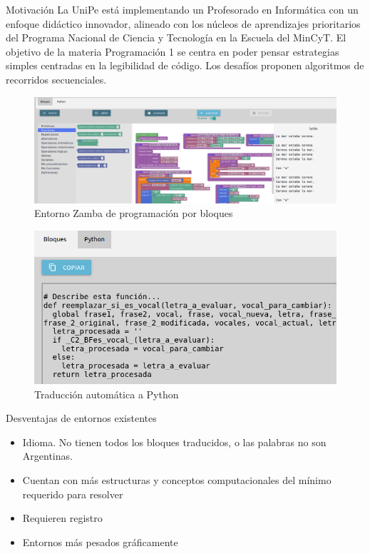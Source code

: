 \documentclass[final]{beamer}
\newlength{\twocolwid}
\begin{document}
\begin{frame}[t]
\begin{columns}[t]
\begin{column}{\twocolwid}
\begin{block}{Motivación}
    La UniPe está implementando un Profesorado en Informática con un enfoque didáctico innovador, alineado con los núcleos de aprendizajes prioritarios del Programa Nacional de Ciencia y Tecnología en la Escuela del MinCyT.
    El objetivo de la materia Programación 1 se centra en poder pensar estrategias simples centradas en la legibilidad de código. 
    Los desafíos proponen algoritmos de recorridos secuenciales.
\end{block}

\begin{figure}
	\centering
	\includegraphics[width=1\linewidth]{zamba}
	\caption{Entorno Zamba de programación por bloques}
	\label{fig:zamba}
\end{figure}

\begin{figure}
	\centering
	\includegraphics[width=0.7\linewidth]{pythonzamba.png}
	\caption{Traducción automática a Python }
	\label{fig:traduccion}
\end{figure}

\begin{block}{Desventajas de entornos existentes}
\begin{itemize}
    \item Idioma. No tienen todos los bloques traducidos, o las palabras no son Argentinas.
    \item Cuentan con más estructuras y conceptos computacionales del mínimo requerido para resolver
    \item Requieren registro
    \item Entornos más pesados gráficamente
\end{itemize}
\end{block}



\end{column}
\end{columns}
\end{frame}
\end{document}
